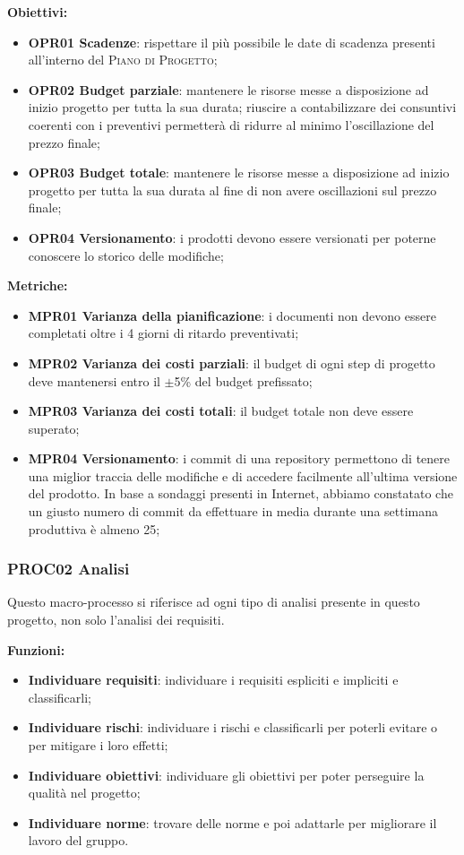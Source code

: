 \documentclass[../piano_di_qualifica.tex]{subfiles}
\begin{document}
\textbf{Obiettivi:}
\smallbreak
\begin{itemize}
	\item \textbf{OPR01 Scadenze}: rispettare il più possibile le date di scadenza presenti all'interno del \textsc{Piano di Progetto};
	\item \textbf{OPR02 Budget parziale}: mantenere le risorse messe a disposizione ad inizio progetto per tutta la sua durata; riuscire a contabilizzare dei consuntivi coerenti con i preventivi permetterà di ridurre al minimo l'oscillazione del prezzo finale;
	\item \textbf{OPR03 Budget totale}: mantenere le risorse messe a disposizione ad inizio progetto per tutta la sua durata al fine di non avere oscillazioni sul prezzo finale;
	\item \textbf{OPR04 Versionamento}: i prodotti devono essere versionati per poterne conoscere lo storico delle modifiche;
\end{itemize}

\textbf{Metriche:}
\smallbreak
\begin{itemize}
	\item \textbf{MPR01 Varianza della pianificazione}: i documenti non devono essere completati oltre i 4 giorni di ritardo preventivati;
	\item \textbf{MPR02 Varianza dei costi parziali}: il budget di ogni step di progetto deve mantenersi entro il $\pm$5\% del budget prefissato;
	\item \textbf{MPR03 Varianza dei costi totali}: il budget totale non deve essere superato;
	\item \textbf{MPR04 Versionamento}: i commit di una repository permettono di tenere una miglior traccia delle modifiche e di accedere facilmente all’ultima versione del prodotto. In base a sondaggi presenti in Internet, abbiamo constatato che un giusto numero di commit da effettuare in media durante una settimana produttiva è almeno 25;
\end{itemize}

\subsubsection{PROC02 Analisi}
Questo macro-processo si riferisce ad ogni tipo di analisi presente in questo progetto, non solo l'analisi dei requisiti.

\textbf{Funzioni:}
\smallbreak
\begin{itemize}
	\item \textbf{Individuare requisiti}: individuare i requisiti espliciti e impliciti e classificarli;
	\item \textbf{Individuare rischi}: individuare i rischi e classificarli per poterli evitare o per mitigare i loro effetti;
	\item \textbf{Individuare obiettivi}: individuare gli obiettivi per poter perseguire la qualità nel progetto;
	\item \textbf{Individuare norme}: trovare delle norme e poi adattarle per migliorare il lavoro del gruppo.
\end{itemize}
\end{document}
